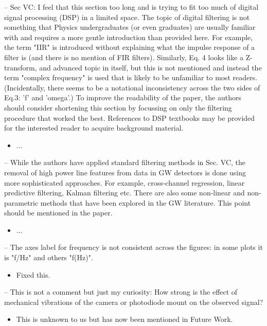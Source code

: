 \documentclass{article}
\newcommand{\todo}{\textcolor{blue}}
\begin{document}
\noindent
-- Sec VC: I feel that this section too long and is trying to fit too much of digital signal processing (DSP) in a limited space. The topic of digital filtering is not something that Physics undergraduates (or even graduates) are usually familiar with and requires a more gentle introduction than provided here. For example, the term "IIR" is introduced without explaining what the impulse response of a filter is (and there is no mention of FIR filters). Similarly, Eq. 4 looks like a Z-transform, and advanced topic in itself, but this is not mentioned and instead the term "complex frequency" is used that is likely to be unfamiliar to most readers. (Incidentally, there seems to be a notational inconsistency across the two sides of Eq.3: 'f' and 'omega'.) To improve the readability of the paper, the authors should consider shortening this section by focussing on only the filtering procedure that worked the best. References to DSP textbooks may be provided for the interested reader to acquire background material. 
\begin{itemize}
\item \todo{...}
\end{itemize}

\noindent
-- While the authors have applied standard filtering methods in Sec. VC, the removal of high power line features from data in GW detectors is done using more sophisticated approaches. For example, cross-channel regression, linear predictive filtering, Kalman filtering etc. There are also some non-linear and non-parametric methods that have been explored in the GW literature. This point should be mentioned in the paper.
\begin{itemize}
\item \todo{...}
\end{itemize}

\noindent
-- The axes label for frequency is not consistent across the figures: in some plots it is "f/Hz" and others "f(Hz)".
\begin{itemize}
\item Fixed this.
\end{itemize}

\noindent
-- This is not a comment but just my curiosity: How strong is the effect of mechanical vibrations of the camera or photodiode mount on the observed signal?

\begin{itemize}
\item This is unknown to us but has now been mentioned in Future Work.
\end{itemize}
\end{document}

